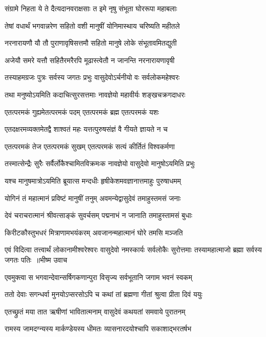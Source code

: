 \twolineshloka
{संग्रामे निहता ये ते दैत्यदानवराक्षसाः}
{त इमे नृषु संभूता घोररूपा महाबलाः}


\twolineshloka
{तेषां वधार्थं भगवान्नरेण सहितो वशी}
{मानुषीं योनिमास्थाय चरिष्यति महीतले}


\twolineshloka
{नरनारायणौ यौ तौ पुराणावृषिसत्तमौ}
{सहितो मानुषे लोके संभूतावमितद्युती}


\twolineshloka
{अजेयौ समरे यत्तौ सहितैरमरैरपि}
{मूढास्त्वेतौ न जानन्ति नरनारायणावृषी}


\twolineshloka
{तस्याहमग्रजः पुत्रः सर्वस्य जगतः प्रभुः}
{वासुदेवोऽर्चनीयो वः सर्वलोकमहेश्वरः}


\twolineshloka
{तथा मनुष्योऽयमिति कदाचित्सुरसत्तमाः}
{नावज्ञेयो महावीर्यः शङ्खचक्रगदाधरः}


\twolineshloka
{एतत्परमकं गुह्यमेतत्परमकं पदम्}
{एतत्परमकं ब्रह्म एतत्परमकं यशः}


\twolineshloka
{एतदक्षरमव्यक्तमेतद्वै शाश्वतं महः}
{यत्तत्पुरुषसंज्ञं वै गीयते ज्ञायते न च}


\twolineshloka
{एतत्परमकं तेज एतत्परमकं सुखम्}
{एतत्परमकं सत्यं कीर्तितं विश्वकर्मणा}


\twolineshloka
{तस्मात्सेन्द्रैः सुरैः सर्वैर्लोकैश्चामितविक्रमःक}
{नावज्ञेयो वासुदेवो मानुषोऽयमिति प्रभुः}


\twolineshloka
{यश्च मानुषमात्रोऽयमिति ब्रूयात्स मन्दधीः}
{हृषीकेशमवज्ञानात्तमाहुः पुरुषाधमम्}


\twolineshloka
{योगिनं तं महात्मानं प्रविष्टं मानुषीं तनुम्}
{अवमन्येद्वासुदेवं तमाहुस्तमसं जनाः}


\twolineshloka
{देवं चराचरात्मानं श्रीवत्साङ्कं सुवर्चसम्}
{पद्मनाभं न जानाति तमाहुस्तामसं बुधाः}


\twolineshloka
{किरीटकौस्तुभधरं मित्राणामभयंकरम्}
{अवजानन्महात्मानं घोरे तमसि मञ्जति}


\fourlineindentedshloka
{एवं विदित्वा तत्त्वार्थं लोकानामीश्वरेश्वरः}
{वासुदेवो नमस्कार्यः सर्वलोकैः सुरोत्तमाः}
{तस्यामहात्माजो ब्रह्मा सर्वस्य जगतः पतिः ॥भीष्म उवाच}
{}


\twolineshloka
{एवमुक्त्वा स भगवान्देवान्सर्षिगकणान्पुरा}
{विसृज्य सर्वभूतानि जगाम भवनं स्वकम्}


\twolineshloka
{ततो देवाः सगन्धर्वा मुनयोऽप्सरसोऽपि च}
{कथां तां ब्रह्मणा गीतां श्रुत्वा प्रीता दिवं ययुः}


\twolineshloka
{एतच्छ्रुतं मया तात ऋषीणां भावितात्मनाम्}
{वासुदेवं कथयतां समवाये पुरातनम्}


\twolineshloka
{रामस्य जामदग्न्यस्य मार्कण्डेयस्य धीमतः}
{व्यासनारदयोश्चापि सकाशाद्भरतर्षभ}


